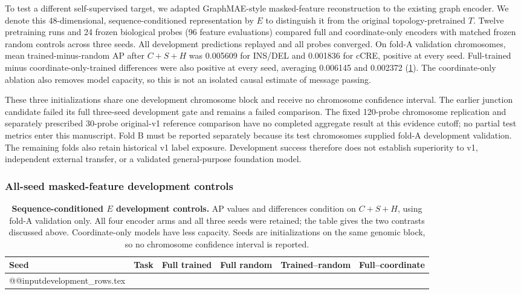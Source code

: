 To test a different self-supervised target, we adapted GraphMAE-style masked-feature reconstruction  to the existing graph encoder. We denote this 48-dimensional, sequence-conditioned representation by $E$ to distinguish it from the original topology-pretrained $T$. Twelve pretraining runs and 24 frozen biological probes (96 feature evaluations) compared full and coordinate-only encoders with matched frozen random controls across three seeds. All development predictions replayed and all probes converged. On fold-A validation chromosomes, mean trained-minus-random AP after $C+S+H$ was 0.005609 for INS/DEL and 0.001836 for cCRE, positive at every seed. Full-trained minus coordinate-only-trained differences were also positive at every seed, averaging 0.006145 and 0.002372 (\cref{tab:s-development}). The coordinate-only ablation also removes model capacity, so this is not an isolated causal estimate of message passing.

These three initializations share one development chromosome block and receive no chromosome confidence interval. The earlier junction candidate failed its full three-seed development gate and remains a failed comparison. The fixed 120-probe chromosome replication and separately prescribed 30-probe original-v1 reference comparison have no completed aggregate result at this evidence cutoff; no partial test metrics enter this manuscript. Fold B must be reported separately because its test chromosomes supplied fold-A development validation. The remaining folds also retain historical v1 label exposure. Development success therefore does not establish superiority to v1, independent external transfer, or a validated general-purpose foundation model.

\subsubsection{All-seed masked-feature development controls}

\begin{table}[H]
\centering
\caption{\textbf{Sequence-conditioned $E$ development controls.} AP values and differences condition on $C+S+H$, using fold-A validation only. All four encoder arms and all three seeds were retained; the table gives the two contrasts discussed above. Coordinate-only models have less capacity. Seeds are initializations on the same genomic block, so no chromosome confidence interval is reported.}
\label{tab:s-development}
\footnotesize
\setlength{\tabcolsep}{4pt}
\begin{tabular}{@{}llrrrr@{}}
\toprule
Seed & Task & Full trained & Full random & Trained--random & Full--coordinate \\
\midrule
\csname @@input\endcsname development_rows.tex
\bottomrule
\end{tabular}
\end{table}


